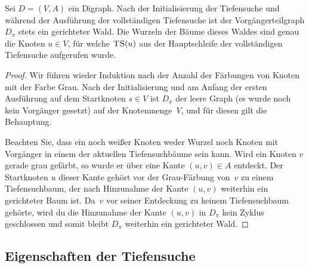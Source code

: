 \begin{lem}
	Sei $D= (V,A)$ ein Digraph. 
	Nach der Initialisierung der Tiefensuche und während der Ausführung der vollständigen Tiefensuche ist der Vorgängerteilgraph $D_\pi$ stets ein gerichteter Wald. Die Wurzeln der Bäume dieses Waldes sind genau die Knoten $u \in V$, für welche $\mathop{\text{\textsc{TS}}}(u)$ aus der Hauptschleife der vollständigen Tiefensuche aufgerufen wurde. 
\end{lem} 
\begin{proof} 
Wir führen wieder Induktion nach der Anzahl der Färbungen von Knoten mit der Farbe Grau.
Nach der Initialisierung und am Anfang der ersten Ausführung auf dem Startknoten $s \in V$ ist $D_\pi$ der leere Graph (es wurde noch kein Vorgänger gesetzt) auf der Knotenmenge~$V$, und für diesen gilt die Behauptung.

Beachten Sie, dass ein noch weißer Knoten weder Wurzel noch Knoten mit Vorgänger in einem der aktuellen Tiefensuchbäume sein kann.
Wird ein Knoten $v$ gerade grau gefärbt, so wurde er über eine Kante $(u,v) \in A$ entdeckt.
Der Startknoten $u$ dieser Kante gehört vor der Grau-Färbung von~$v$ zu einem Tiefensuchbaum, der nach Hinzunahme der Kante $(u,v)$ weiterhin ein gerichteter Baum ist.
Da~$v$ vor seiner Entdeckung zu keinem Tiefensuchbaum gehörte, wird du die Hinzunahme der Kante $(u,v)$ in $D_\pi$ kein Zyklus geschlossen und somit bleibt $D_\pi$ weiterhin ein gerichteter Wald.
\end{proof} 



\condclearpage
\subsection{Eigenschaften der Tiefensuche}


